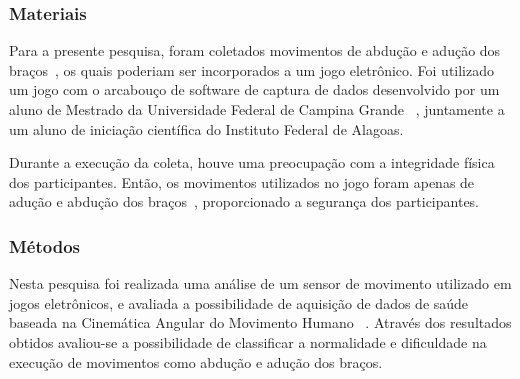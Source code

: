 \subsubsection{Materiais}
Para a presente pesquisa, foram coletados movimentos de abdução e adução dos braços~\cite{mcginnis2013biomechanics}, os quais poderiam ser incorporados a um jogo eletrônico. Foi utilizado um jogo com o arcabouço de software de captura de dados desenvolvido por um aluno de Mestrado da Universidade Federal de Campina Grande ~\cite{antonio2013}, juntamente a um aluno de iniciação científica do Instituto Federal de Alagoas. 

Durante a execução da coleta, houve uma preocupação com a integridade física dos participantes. Então, os movimentos utilizados no jogo foram apenas de adução e abdução dos braços~\cite{mcginnis2013biomechanics}, proporcionado a segurança dos participantes. 

%

\subsubsection{Métodos}
Nesta pesquisa foi realizada uma análise de um sensor de movimento utilizado em jogos eletrônicos, e avaliada a possibilidade de aquisição de dados de saúde baseada na Cinemática Angular do Movimento Humano ~\cite{hamill1999bases}.  Através dos resultados obtidos avaliou-se a possibilidade de classificar a normalidade e dificuldade na execução de movimentos como abdução e adução dos braços.

